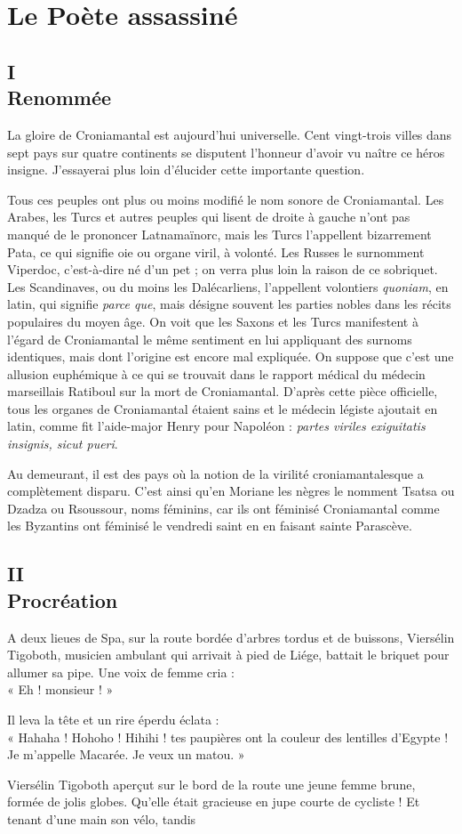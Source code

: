 \documentclass[18pt,a4paper,frenchb]{article}
\begin{document}
\section*{Le Poète assassiné}
\subsection*{I \\ Renommée}

La gloire de Croniamantal est aujourd'hui universelle. Cent vingt-trois villes dans sept pays sur quatre continents se disputent l'honneur d'avoir vu naître ce héros insigne. J'essayerai plus loin d'élucider cette importante question.

Tous ces peuples ont plus ou moins modifié le nom sonore de Croniamantal. Les Arabes, les Turcs et autres peuples qui lisent de droite à gauche n'ont pas manqué de le prononcer Latnamaïnorc, mais les Turcs l'appellent bizarrement Pata, ce qui signifie oie ou organe viril, à volonté. Les Russes le surnomment Viperdoc, c'est-à-dire né d'un pet ; on verra plus loin la raison de ce sobriquet. Les Scandinaves, ou du moins les Dalécarliens, l'appellent volontiers \textit{quoniam}, en latin, qui signifie \textit{parce que}, mais désigne souvent les parties nobles dans les récits populaires du moyen âge. On voit que les Saxons et les Turcs manifestent à l'égard de Croniamantal le même sentiment en lui appliquant des surnoms identiques, mais dont l'origine est encore mal expliquée. On suppose que c'est une allusion euphémique à ce qui se trouvait dans le rapport médical du médecin marseillais Ratiboul sur la mort de Croniamantal. D'après cette pièce officielle, tous les organes de Croniamantal étaient sains et le médecin légiste ajoutait en latin, comme fit l'aide-major Henry pour Napoléon : \textit{partes viriles exiguitatis insignis, sicut pueri}.

Au demeurant, il est des pays où la notion de la virilité croniamantalesque a complètement disparu. C'est ainsi qu'en Moriane les nègres le nomment Tsatsa ou Dzadza ou Rsoussour, noms féminins, car ils ont féminisé Croniamantal comme les Byzantins ont féminisé le vendredi saint en en faisant sainte Parascève.

\subsection*{II \\ Procréation}

A deux lieues de Spa, sur la route bordée d'arbres tordus et de buissons, Viersélin Tigoboth, musicien ambulant qui arrivait à pied de Liége, battait le briquet pour allumer sa pipe. Une voix de femme cria :\\« Eh ! monsieur ! »

Il leva la tête et un rire éperdu éclata :\\« Hahaha ! Hohoho ! Hihihi ! tes paupières ont la couleur des lentilles d'Egypte ! Je m'appelle Macarée. Je veux un matou. »

Viersélin Tigoboth aperçut sur le bord de la route une jeune femme brune, formée de jolis globes. Qu'elle était gracieuse en jupe courte de cycliste ! Et tenant d'une main son vélo, tandis
\end{document}
